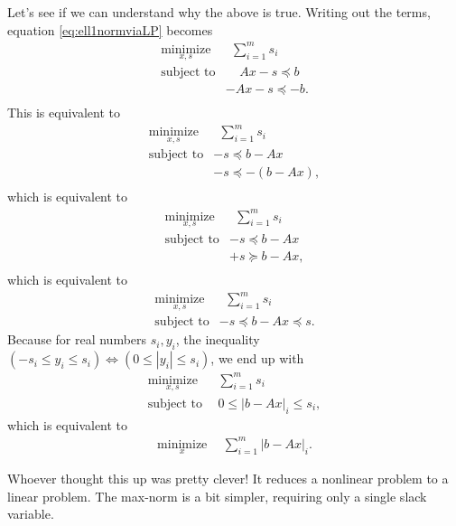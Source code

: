 Let's see if we can understand why the above is true. Writing out the terms, equation \eqref{eq:ell1normviaLP} becomes
\begin{align*}
\underset{x, s}{\text{minimize}}& ~~ \sum_{i=1}^m s_i \\
\text{subject to} &~~~~\ A x -s \preceq b \\
                 &-A x -s \preceq -b.\\
\end{align*}
This is equivalent to 
\begin{align*}
\underset{x, s}{\text{minimize}}& ~~ \sum_{i=1}^m s_i \\
\text{subject to} &-s \preceq b -Ax\\
                 & -s \preceq -(b - Ax),\\
\end{align*}
which is equivalent to
\begin{align*}
\underset{x, s}{\text{minimize}}& ~~ \sum_{i=1}^m s_i \\
\text{subject to} &-s \preceq b -Ax\\
                 & +s \succeq b - Ax,\\
\end{align*}
which is equivalent to
\begin{align*}
\underset{x, s}{\text{minimize}}& ~~ \sum_{i=1}^m s_i \\
\text{subject to} &-s \preceq b -Ax \preceq s.
\end{align*}
Because for real numbers $s_i, y_i$, the inequality $(-s_i\le y_i \le s_i) \iff (0 \le |y_i| \le s_i) $,
we end up with 
\begin{align*}
\underset{x, s}{\text{minimize}} & ~~ \sum_{i=1}^m s_i \\
\text{subject to} &~~ 0\le  |b -Ax|_i \le  s_i,
\end{align*}
which is equivalent to
\begin{align*}
\underset{x}{\text{minimize}} & ~~ \sum_{i=1}^m  |b -Ax|_i. 
\end{align*}

Whoever thought this up was pretty clever! It reduces a nonlinear problem to a linear problem. The max-norm is a bit simpler, requiring only a single slack variable.

\vspace*{.2cm}

